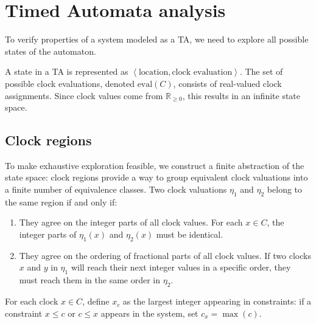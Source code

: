 \section{Timed Automata analysis}

To verify properties of a system modeled as a TA, we need to explore all possible states of the automaton.

A state in a TA is represented as $\left\langle \text{location},\text{clock evaluation}\right\rangle$.
The set of possible clock evaluations, denoted $\text{eval}(C)$, consists of real-valued clock assignments.
Since clock values come from $\mathbb{R}_{\geq 0}$, this results in an infinite state space.

\subsection{Clock regions}
To make exhaustive exploration feasible, we construct a finite abstraction of the state space: clock regions provide a way to group equivalent clock valuations into a finite number of equivalence classes.
Two clock valuations $\eta_1$ and $\eta_2$ belong to the same region if and only if:
\begin{enumerate}
    \item They agree on the integer parts of all clock values.
        For each  $x\in C$, the integer parts of $\eta_1(x)$ and $\eta_2(x)$ must be identical.
    \item They agree on the ordering of fractional parts of all clock values.
        If two clocks $x$ and $y$ in $\eta_1$ will reach their next integer values in a specific order, they must reach them in the same order in $\eta_2$.
\end{enumerate}
\noindent For each clock $x\in C$, define $x_c$ as the largest integer appearing in constraints: if a constraint $x \leq c$ or $c\leq x$ appears in the system, set $c_x=\max(c)$.

